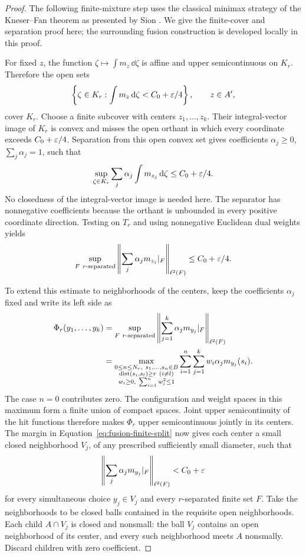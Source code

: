 \begin{proof}
The following finite-mixture step uses the classical minimax strategy
of the Kneser--Fan theorem as presented by Sion
\cite[Theorem~4.2, p.~175]{Sion1958}.  We give the finite-cover and
separation proof here; the surrounding fusion construction is developed
locally in this proof.

For fixed \(z\), the function
\(\zeta\mapsto\int m_z\,\dd\zeta\) is affine and upper
semicontinuous on \(K_r\).  Therefore the open sets
\[
 \left\{\zeta\in K_r:\int m_z\,\mathrm d\zeta<C_0+\varepsilon/4\right\},
 \qquad z\in A',
\]
cover \(K_r\).  Choose a finite subcover with centers
\(z_1,\ldots,z_k\).  Their integral-vector image of \(K_r\) is convex
and misses the open orthant in which every coordinate exceeds
\(C_0+\varepsilon/4\).  Separation from this open convex set gives coefficients
\(\alpha_j\ge0\), \(\sum_j\alpha_j=1\), such that
\[
 \sup_{\zeta\in K_r}\sum_j\alpha_j\int m_{z_j}\,\mathrm d\zeta
 \le C_0+\varepsilon/4.
\]
No closedness of the integral-vector image is needed here.  The separator
has nonnegative coefficients because the orthant is unbounded in every
positive coordinate direction.  Testing on \(T_r\) and using nonnegative
Euclidean dual weights yields
\begin{equation}\label{eq:fusion-finite-split}
 \sup_{F\ r\text{-separated}}
 \left\|\sum_j\alpha_jm_{z_j}|_F\right\|_{\ell^2(F)}
 \le C_0+\varepsilon/4.
\end{equation}

To extend this estimate to neighborhoods of the centers, keep the
coefficients $\alpha_j$ fixed and write its left side as
\[
 \begin{split}
 \Phi_r(y_1,\ldots,y_k)
 &=\sup_{F\ r\text{-separated}}
       \left\|\sum_{j=1}^k\alpha_jm_{y_j}|_F\right\|_{\ell^2(F)}\\
 &=\max_{\substack{0\le n\le N_r,\ s_1,\ldots,s_n\in B\\
                   \operatorname{dist}(s_i,s_l)\ge r\ (i\ne l)\\
                   w_i\ge0,\ \sum_{i=1}^n w_i^2\le1}}
       \sum_{i=1}^n\sum_{j=1}^k w_i\alpha_jm_{y_j}(s_i).
 \end{split}
\]
The case $n=0$ contributes zero.  The configuration and weight spaces in
this maximum form a finite union of compact spaces.  Joint upper
semicontinuity of the hit functions therefore makes $\Phi_r$ upper
semicontinuous jointly in its centers.  The margin in
Equation~\eqref{eq:fusion-finite-split} now gives each center a small
closed neighborhood \(V_j\), of any
prescribed sufficiently small diameter, such that
\begin{equation}\label{eq:fusion-neighborhood-split}
 \left\|\sum_j\alpha_jm_{y_j}|_F\right\|_{\ell^2(F)}<C_0+\varepsilon
\end{equation}
for every simultaneous choice \(y_j\in V_j\) and every \(r\)-separated
finite set \(F\).  Take the neighborhoods to be closed balls contained in
the requisite open neighborhoods.  Each child \(A\cap V_j\) is closed
and nonsmall: the ball $V_j$ contains an open neighborhood of its center,
and every such neighborhood meets $A$ nonsmally.  Discard children with
zero coefficient.


\end{proof}

